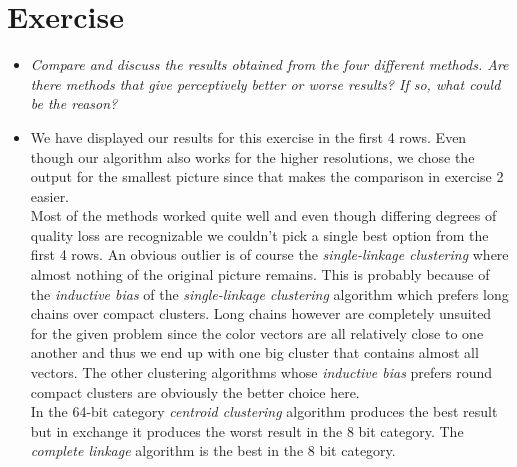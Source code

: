 \documentclass[a4paper]{image-gallery}
\begin{document}
%
%
%
  \ttfamily\footnotesize
  \newpage
  \normalsize\normalfont
  \section{Exercise}
  \begin{itemize}
  	\item \textit{Compare and discuss the results obtained from the four different methods. Are there methods that give perceptively better or worse results? If so, what could be the reason?}
	\item We have displayed our results for this exercise in the first 4 rows. Even though our algorithm also works for the higher resolutions, we chose the output for the smallest picture since that makes the comparison in exercise 2 easier. \\ Most of the methods worked quite well and even though differing degrees of quality loss are recognizable we couldn't pick a single best option from the first 4 rows. An obvious outlier is of course the \textit{single-linkage clustering} where almost nothing of the original picture remains. This is probably because of the \textit{inductive bias} of the \textit{single-linkage clustering} algorithm which prefers long chains over compact clusters. Long chains however are completely unsuited for the given problem since the color vectors are all relatively close to one another and thus we end up with one big cluster that contains almost all vectors. The other clustering algorithms whose \textit{inductive bias} prefers round compact clusters are obviously the better choice here. \\ In the 64-bit category \textit{centroid clustering} algorithm produces the best result but in exchange it produces the worst result in the 8 bit category. The \textit{complete linkage} algorithm is the best in the 8 bit category.
  \end{itemize}
\end{document}

